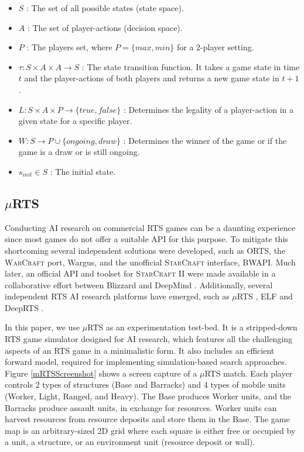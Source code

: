 \documentclass[conference]{IEEEtran}
\newcommand{\mRTS}{$\mu$RTS}
\begin{document}
\begin{itemize}
\item $S$ : The set of all possible states (state space).
\item $A$ : The set of player-actions (decision space).
\item $P$ : The players set, where $P=\{max,min\}$ for a 2-player setting.
\item $\tau : S \times A \times A \rightarrow S$ : The state transition function. It takes a game state in time $t$ and the player-actions of both players and returns a new game state in $t+1$.
\item $L: S \times A \times P \rightarrow \{true,false\}$ : Determines the legality of a player-action in a given state for a specific player.
\item $W: S \rightarrow P \cup \{ongoing,draw\}$ : Determines the winner of the game or if the game is a draw or is still ongoing.
\item $s_{init} \in S$ : The initial state.
\end{itemize}


\subsection{\mRTS{}}

Conducting AI research on commercial RTS games can be a daunting experience since most games do not offer a suitable API for this purpose. To mitigate this shortcoming several independent solutions were developed, such as ORTS, the \textsc{WarCraft} port, Wargus, and the unofficial \textsc{StarCraft} interface, BWAPI. Much later, an official API and toolset for \textsc{StarCraft II} were made available in a collaborative effort between Blizzard and DeepMind \cite{vinyals_starcraft_2017-1}. Additionally, several independent RTS AI research platforms have emerged, such as \mRTS{} \cite{ontanon_combinatorial_2017}, ELF \cite{tian_elf:_2017} and DeepRTS \cite{andersen_deep_2018}.

In this paper, we use \mRTS{} as an experimentation test-bed. It is a stripped-down RTS game simulator designed for AI research, which features all the challenging aspects of an RTS game in a minimalistic form. It also includes an efficient forward model, required for implementing simulation-based search approaches. Figure \ref{mRTSScreenshot} shows a screen capture of a \mRTS{} match. Each player controls 2 types of structures (Base and Barracks) and 4 types of mobile units (Worker, Light, Ranged, and Heavy). The Base produces Worker units, and the Barracks produce assault units, in exchange for resources. Worker units can harvest resources from resource deposits and store them in the Base. The game map is an arbitrary-sized 2D grid where each square is either free or occupied by a unit, a structure, or an environment unit (resource deposit or wall).
\end{document}
